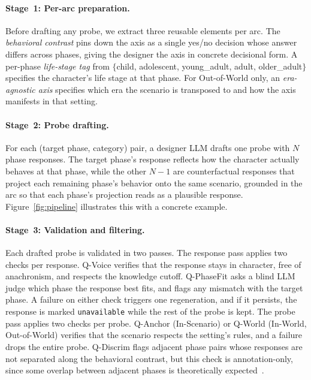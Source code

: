 \documentclass{llmxive}
\begin{document}
\paragraph{Stage~1: Per-arc preparation.}
Before drafting any probe, we extract three reusable elements per arc. The \emph{behavioral contrast} pins down the axis as a single yes/no decision whose answer differs across phases, giving the designer the axis in concrete decisional form. A per-phase \emph{life-stage tag} from $\{$child, adolescent, young\_adult, adult, older\_adult$\}$ specifies the character's life stage at that phase. For Out-of-World only, an \emph{era-agnostic axis} specifies which era the scenario is transposed to and how the axis manifests in that setting.

\paragraph{Stage~2: Probe drafting.}
For each (target phase, category) pair, a designer LLM drafts one probe with $N$ phase responses. The target phase's response reflects how the character actually behaves at that phase, while the other $N{-}1$ are counterfactual responses that project each remaining phase's behavior onto the same scenario, grounded in the arc so that each phase's projection reads as a plausible response. 
Figure~\ref{fig:pipeline} illustrates this with a concrete example.

\paragraph{Stage~3: Validation and filtering.}
Each drafted probe is validated in two passes. The response pass applies two checks per response. Q-Voice verifies that the response stays in character, free of anachronism, and respects the knowledge cutoff. Q-PhaseFit asks a blind LLM judge which phase the response best fits, and flags any mismatch with the target phase. A failure on either check triggers one regeneration, and if it persists, the response is marked \texttt{unavailable} while the rest of the probe is kept. The probe pass applies two checks per probe. Q-Anchor (In-Scenario) or Q-World (In-World, Out-of-World) verifies that the scenario respects the setting's rules, and a failure drops the entire probe. Q-Discrim flags adjacent phase pairs whose responses are not separated along the behavioral contrast, but this check is annotation-only, since some overlap between adjacent phases is theoretically expected~\cite{Fleeson2001TowardAS}.
\end{document}
